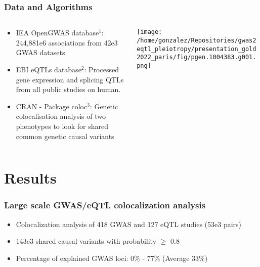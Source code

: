 \documentclass{beamer}
\begin{document}
\begin{frame}
\frametitle{Data and Algorithms}

\begin{columns}
\begin{column}{0.5\textwidth}
\begin{itemize}
\item IEA OpenGWAS database$^1$: 244,881e6 associations from 42e3 GWAS datasets
\item EBI eQTLs database$^2$: Processed gene expression and splicing QTLs from all public studies on human.
\item CRAN - Package coloc$^3$: Genetic colocalisation analysis of two phenotypes to look for shared common genetic causal variants
\end{itemize}
\end{column}
\begin{column}{0.5\textwidth}
\begin{center}
\texttt{[image: /home/gonzalez/Repositories/gwas2eqtl\_pleiotropy/presentation\_gold2022\_paris/fig/pgen.1004383.g001.png]}
\end{center}
\end{column}
\end{columns}

\let\thefootnote\relax{}
\let\thefootnote\relax{}
\let\thefootnote\relax{}
\end{frame}


\section{Results}

\begin{frame}
\frametitle{Large scale GWAS/eQTL colocalization analysis}

\begin{itemize}
\item Colocalization analysis of 418 GWAS and 127 eQTL studies (53e3 pairs)
\item 143e3 shared causal variants with probability $\geq$ 0.8
\item Percentage of explained GWAS loci: 0$\%$ - 77$\%$ (Average 33$\%$)
\end{itemize}


\end{frame}
\end{document}
